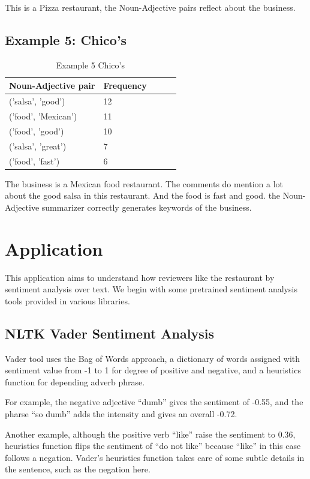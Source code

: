 \documentclass[sigconf]{acmart}
\begin{document}
This is a Pizza restaurant, the Noun-Adjective pairs reflect about the business.

\subsection{Example 5: Chico's}
\begin{table}
  \caption{Example 5 Chico's}
  \label{tab:n_adj_5}
  \begin{tabular}{lllll}
    \toprule
    Noun-Adjective pair & Frequency \\
    \midrule
    ('salsa', 'good') & 12\\
    ('food', 'Mexican') & 11\\
    ('food', 'good') & 10\\
    ('salsa', 'great') & 7\\
    ('food', 'fast') & 6\\
\end{tabular}
\end{table}
The business is a Mexican food restaurant. The comments do mention a lot about the good salsa in this restaurant. And the food is fast and good. the Noun-Adjective summarizer correctly generates keywords of the business.

\section{Application}
This application aims to understand how reviewers like the restaurant by sentiment analysis over text. We begin with some pretrained sentiment analysis tools provided in various libraries.  

\subsection{NLTK Vader Sentiment Analysis\cite{Vader}}

Vader tool uses the Bag of Words approach, a dictionary of words assigned with sentiment value from -1 to 1 for degree of positive and negative, and a heuristics function for depending adverb phrase. 

For example, the negative adjective “dumb” gives the sentiment of -0.55, and the pharse “so dumb” adds the intensity and gives an overall -0.72. 

Another example, although the positive verb “like” raise the sentiment to 0.36, heuristics function flips the sentiment of “do not like” because “like” in this case follows a negation. Vader’s heuristics function takes care of some subtle details in the sentence, such as the negation here.
\end{document}
